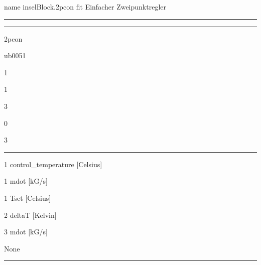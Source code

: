 \label{2pcon}\hypertarget{2pcon}{}
\pdfdest name {inselBlock.2pcon} fit
Einfacher Zweipunktregler

\bigskip

\hrule

\begin{center}

\end{center}

\medskip

\hrule

\begin{layoutlist}
\item[{\bf \mblue{Name}}]        2pcon
\item[{\bf \mblue{Function}}]    ub0051
\item[{\bf \mblue{Inputs}}]      1
\item[{\bf \mblue{Outputs}}]     1
\item[{\bf \mblue{Parameters}}]  3
\item[{\bf \mblue{Strings}}]     0
\item[{\bf \mblue{Group}}]       3
\end{layoutlist}

\medskip

\hrule

\bigskip

%
\begin{detaillist}
\item[1] control_temperature [Celsius]
\end{detaillist}

%
\begin{detaillist}
\item[1] mdot [kG/s]
\end{detaillist}

%
\begin{detaillist}
\item[1] Tset [Celsius]
\item[2] deltaT [Kelvin]
\item[3] mdot [kG/s]
\end{detaillist}

%
\begin{detaillist}
\item[]  None
\end{detaillist}

\bigskip

\hrule
